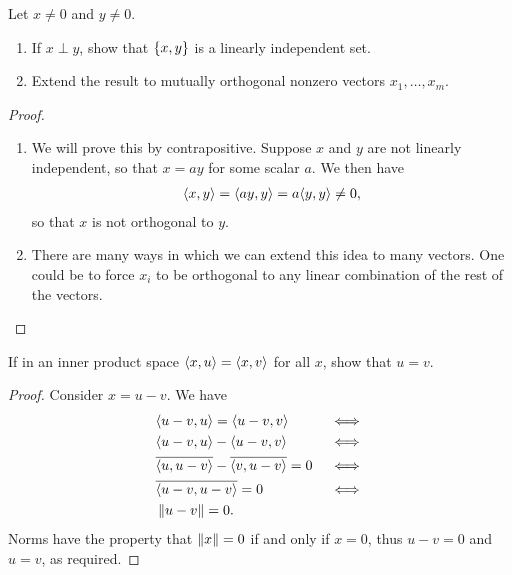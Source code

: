 \begin{exercise}{6}
Let $x\neq 0$ and $y\neq 0$.
\begin{enumerate}
    \item If $x\perp y$, show that $\{x,y\}$ is a linearly independent set.
    \item Extend the result to mutually orthogonal nonzero vectors $x_1,\dots, x_m$.
\end{enumerate}
\end{exercise}
\begin{proof}
\begin{enumerate}
    \item We will prove this by contrapositive.
    Suppose $x$ and $y$ are not linearly independent, so that $x=ay$ for some scalar $a$.
    We then have
    \begin{align*}
        \langle x,y\rangle
        = \langle ay, y\rangle 
        = a\langle y,y\rangle 
        \neq 0,
    \end{align*}
    so that $x$ is not orthogonal to $y$.
    \item There are many ways in which we can extend this idea to many vectors.
    One could be to force $x_i$ to be orthogonal to any linear combination of the rest of the vectors.
\end{enumerate}
\end{proof}

\begin{exercise}{7}
If in an inner product space $\langle x,u\rangle = \langle x,v\rangle$ for all $x$, show that $u=v$.
\end{exercise}
\begin{proof}
Consider $x=u-v$.
We have
\begin{align*}
    &\langle u-v, u\rangle = \langle u-v, v\rangle &&\iff\\
    &\langle u-v, u\rangle - \langle u-v, v\rangle &&\iff\\
    &\overline{\langle u, u-v\rangle} - \overline{\langle v, u-v\rangle} = 0 &&\iff\\
    &\overline{\langle u-v,u-v\rangle} = 0 &&\iff\\
    &\left\lVert u-v\right\rVert = 0.
\end{align*}
Norms have the property that $\left\lVert x\right\rVert = 0$ if and only if $x=0$, thus $u-v=0$ and $u=v$, as required.
\end{proof}

